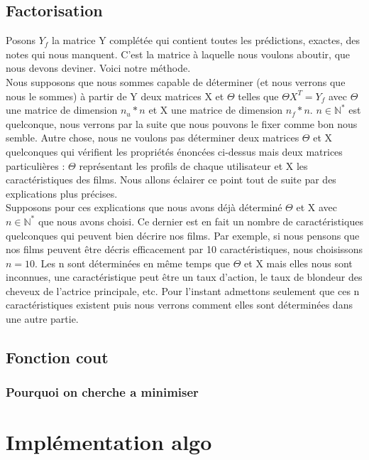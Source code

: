 \documentclass[a4paper,10pt]{article}
\begin{document}
\subsection{Factorisation}

Posons $Y_f$ la matrice Y complétée qui contient toutes les prédictions, exactes, des notes qui nous manquent. C'est la matrice à laquelle nous voulons aboutir, que nous devons deviner. Voici notre méthode.\\ 
 
Nous supposons que nous sommes capable de déterminer (et nous verrons que nous le sommes) à partir de Y deux matrices X et $\Theta$ telles que $\Theta X^T = Y_f$ avec $\Theta$ une matrice de dimension $n_u * n$ et X une matrice de dimension $n_f * n$. $n \in \mathbb{N}^*$ est quelconque, nous verrons par la suite que nous pouvons le fixer comme bon nous semble. 
Autre chose, nous ne voulons pas déterminer deux matrices $\Theta$ et X quelconques qui vérifient les propriétés énoncées ci-dessus mais deux matrices particulières : $\Theta$ représentant les profils de chaque utilisateur et X les caractéristiques des films. Nous allons éclairer ce point tout de suite par des explications plus précises.\\ 
 
Supposons pour ces explications que nous avons déjà déterminé $\Theta$ et X avec $n \in \mathbb{N}^*$ que nous avons choisi. Ce dernier est en fait un nombre de caractéristiques quelconques qui peuvent bien décrire nos films. Par exemple, si nous pensons que nos films peuvent être décris efficacement par 10 caractéristiques, nous choisissons $n = 10$. 
Les n sont déterminées en même temps que $\Theta$ et X mais elles nous sont inconnues, une caractéristique peut être un taux d'action, le taux de blondeur des cheveux de l'actrice principale, etc. Pour l'instant admettons seulement que ces n caractéristiques existent puis nous verrons comment elles sont déterminées dans une autre partie. 



\subsection{Fonction cout}
\subsubsection{Pourquoi on cherche a minimiser}
\section{Implémentation algo}
\end{document}
